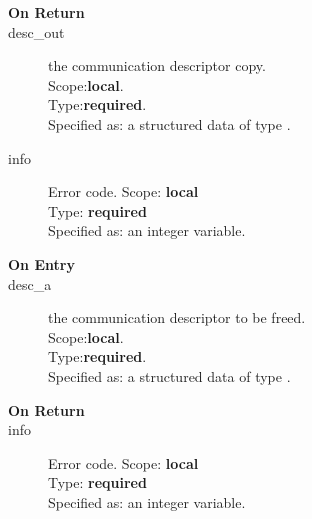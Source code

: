 \begin{description}
\item[\bf On Return]
\item[desc\_out] the communication descriptor copy.\\
Scope:{\bf local}.\\
Type:{\bf required}.\\
Specified as: a structured data of type \descdata.
\item[info] Error code.
Scope: {\bf local} \\
Type: {\bf required}\\
Specified as: an integer variable.\\
\end{description}


%
%


\begin{description}
\item[\bf On Entry]
\item[desc\_a] the communication descriptor to be freed.\\
Scope:{\bf local}.\\
Type:{\bf required}.\\
Specified as: a structured data of type \descdata.
\end{description}

\begin{description}
\item[\bf On Return]
\item[info] Error code.
Scope: {\bf local} \\
Type: {\bf required}\\
Specified as: an integer variable.
\end{description}




